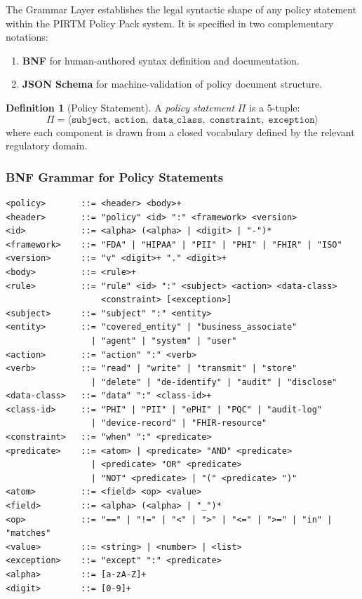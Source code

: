 \documentclass[12pt,letterpaper]{article}
\theoremstyle{definition}
\newtheorem{definition}{Definition}[section]
\theoremstyle{plain}
\theoremstyle{remark}
\begin{document}
The Grammar Layer establishes the legal syntactic shape of any policy statement
within the PIRTM Policy Pack system. It is specified in two complementary
notations:

\begin{enumerate}
  \item \textbf{BNF} for human-authored syntax definition and documentation.
  \item \textbf{JSON Schema} for machine-validation of policy document
  structure.
\end{enumerate}

\begin{definition}[Policy Statement]
A \emph{policy statement} $\Pi$ is a 5-tuple:
\begin{equation}
\Pi = \langle \mathtt{subject},\; \mathtt{action},\;
              \mathtt{data\_class},\; \mathtt{constraint},\;
              \mathtt{exception} \rangle
\label{eq:policystatement}
\end{equation}
where each component is drawn from a closed vocabulary defined by the relevant
regulatory domain.
\end{definition}

\subsubsection{BNF Grammar for Policy Statements}

\begin{lstlisting}[style=bnfStyle, caption={Core BNF grammar for PIRTM Policy DSL v1}]
<policy>       ::= <header> <body>+
<header>       ::= "policy" <id> ":" <framework> <version>
<id>           ::= <alpha> (<alpha> | <digit> | "-")*
<framework>    ::= "FDA" | "HIPAA" | "PII" | "PHI" | "FHIR" | "ISO"
<version>      ::= "v" <digit>+ "." <digit>+
<body>         ::= <rule>+
<rule>         ::= "rule" <id> ":" <subject> <action> <data-class>
                   <constraint> [<exception>]
<subject>      ::= "subject" ":" <entity>
<entity>       ::= "covered_entity" | "business_associate"
                 | "agent" | "system" | "user"
<action>       ::= "action" ":" <verb>
<verb>         ::= "read" | "write" | "transmit" | "store"
                 | "delete" | "de-identify" | "audit" | "disclose"
<data-class>   ::= "data" ":" <class-id>+
<class-id>     ::= "PHI" | "PII" | "ePHI" | "PQC" | "audit-log"
                 | "device-record" | "FHIR-resource"
<constraint>   ::= "when" ":" <predicate>
<predicate>    ::= <atom> | <predicate> "AND" <predicate>
                 | <predicate> "OR" <predicate>
                 | "NOT" <predicate> | "(" <predicate> ")"
<atom>         ::= <field> <op> <value>
<field>        ::= <alpha> (<alpha> | "_")*
<op>           ::= "==" | "!=" | "<" | ">" | "<=" | ">=" | "in" | "matches"
<value>        ::= <string> | <number> | <list>
<exception>    ::= "except" ":" <predicate>
<alpha>        ::= [a-zA-Z]+
<digit>        ::= [0-9]+
\end{lstlisting}
\end{document}
